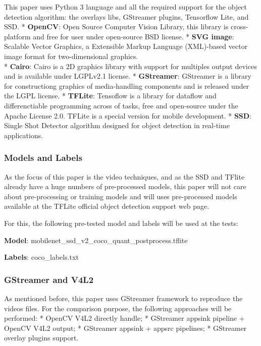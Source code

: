 \documentclass[11pt]{article}
\begin{document}
This paper uses Python 3 language and all the required support for the
object detection algorithm: the overlays libs, GStreamer plugins,
Tensorflow Lite, and SSD. * \textbf{OpenCV}: Open Source Computer Vision
Library, this library is cross-platform and free for user under
open-source BSD license. * \textbf{SVG image}: Scalable Vector Graphics,
a Extensible Markup Language (XML)-based vector image format for
two-dimensional graphics.\\
* \textbf{Cairo}: Cairo is a 2D graphics library with support for
multiples output devices and is available under LGPLv2.1 license. *
\textbf{GStreamer}: GStreamer is a library for constructiong graphics of
media-handling components and is released under the LGPL license. *
\textbf{TFLite}: Tensoflow is a library for dataflow and differenctiable
programming across of tasks, free and open-source under the Apache
License 2.0. TFLite is a special version for mobile development. *
\textbf{SSD}: Single Shot Detector algorithm designed for object
detection in real-time applications.

    \subsubsection{Models and Labels}\label{models-and-labels}

As the focus of this paper is the video techniques, and as the SSD and
TFlite already have a huge numbers of pre-processed models, this paper
will not care about pre-processing or training models and will uses
pre-processed models available at the TFLite official object detection
support web page.

For this, the following pre-tested model and labels will be used at the
tests:

\textbf{Model}: mobilenet\_ssd\_v2\_coco\_quant\_postprocess.tflite

\textbf{Labels}: coco\_labels.txt

    \subsubsection{GStreamer and V4L2}\label{gstreamer-and-v4l2}

As mentioned before, this paper uses GStreamer framework to reproduce
the videos files. For the comparison purpose, the following approaches
will be performed: * OpenCV V4L2 directly handle; * GStreamer appsink
pipeline + OpenCV V4L2 output; * GStreamer appsink + appsrc pipelines; *
GStreamer overlay plugins support.
\end{document}
